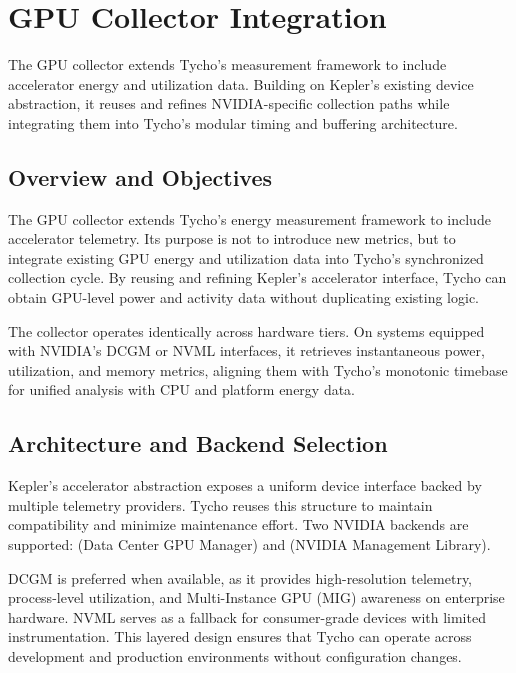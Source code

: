 \section{GPU Collector Integration}
\label{sec:gpu_collector}

The GPU collector extends Tycho’s measurement framework to include accelerator energy and utilization data. Building on Kepler’s existing device abstraction, it reuses and refines NVIDIA-specific collection paths while integrating them into Tycho’s modular timing and buffering architecture.

\subsection{Overview and Objectives}
\label{subsec:gpu_overview}

The GPU collector extends Tycho’s energy measurement framework to include accelerator telemetry. Its purpose is not to introduce new metrics, but to integrate existing GPU energy and utilization data into Tycho’s synchronized collection cycle. By reusing and refining Kepler’s accelerator interface, Tycho can obtain GPU-level power and activity data without duplicating existing logic.  

The collector operates identically across hardware tiers. On systems equipped with NVIDIA’s DCGM or NVML interfaces, it retrieves instantaneous power, utilization, and memory metrics, aligning them with Tycho’s monotonic timebase for unified analysis with CPU and platform energy data.

\subsection{Architecture and Backend Selection}
\label{subsec:gpu_backend}

Kepler’s accelerator abstraction exposes a uniform device interface backed by multiple telemetry providers. Tycho reuses this structure to maintain compatibility and minimize maintenance effort. Two NVIDIA backends are supported:  (Data Center GPU Manager) and  (NVIDIA Management Library).  

DCGM is preferred when available, as it provides high-resolution telemetry, process-level utilization, and Multi-Instance GPU (MIG) awareness on enterprise hardware. NVML serves as a fallback for consumer-grade devices with limited instrumentation. This layered design ensures that Tycho can operate across development and production environments without configuration changes.  

